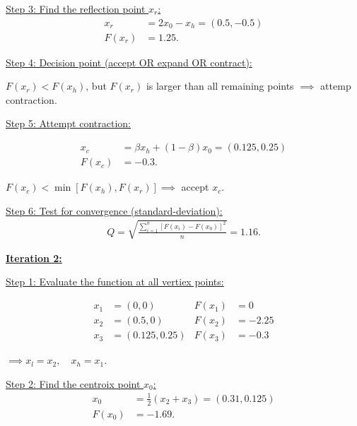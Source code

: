 \documentclass{article}
\begin{document}
\qquad
\underline{Step 3: Find the reflection point $x_r$:}
\begin{align*}
  x_r    &= 2x_0 - x_h = (0.5, -0.5) \\
  F(x_r) &= 1.25.
\end{align*}
\newline

\qquad
\underline{Step 4: Decision point (accept OR expand OR contract):}
\newline

\qquad
$F(x_r) < F(x_h)$, but $F(x_r)$ is larger than all remaining points $\implies$ attemp contraction.
\newline

\qquad
\underline{Step 5: Attempt contraction:}

\begin{align*}
  x_c    &= \beta x_h + (1-\beta) x_0 = (0.125, 0.25) \\
  F(x_c) &= -0.3.
\end{align*}

\qquad
$F(x_c) < \min[F(x_h), F(x_r)] \implies$ accept $x_c$. 
\newline

\qquad
\underline{Step 6: Test for convergence (standard-deviation):}
\begin{align*}
  Q = \sqrt{\frac{\sum_{i=1}^{n}  [ F(x_i) - F(x_0) ]^2 }{n}} = 1.16.
\end{align*}
\newline
\newline


\textbf{\underline{Iteration 2:}}
\newline

\qquad
\underline{Step 1: Evaluate the function at all vertiex points:}

\begin{align*}
  x_1 &= (0,0)   &F(x_1) &= 0 \\
  x_2 &= (0.5,0) &F(x_2) &= -2.25 \\
  x_3 &= (0.125,0.25) &F(x_3) &= -0.3
\end{align*}

\qquad
$\implies x_l = x_2, \quad x_h = x_1.$
\newline

\qquad
\underline{Step 2: Find the centroix point $x_0$:}
\begin{align*}
  x_0    &= \frac{1}{2} (x_2 + x_3) = (0.31, 0.125) \\
  F(x_0) &= -1.69.
\end{align*}
\newline
\end{document}

